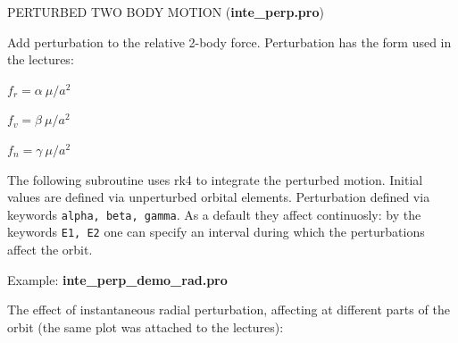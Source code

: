 \documentclass[a4paper,12pt]{article}
\def\red{\color{red}}
\def\black{\color{RGBblack}}
\begin{document}
{{\newpage

\black
{ PERTURBED TWO BODY MOTION} ({\bf inte\_perp.pro})


\hlin
\bul Add perturbation to the relative 2-body force. Perturbation has
the form used in the lectures:


\buu \buu {}

\buu \buu \buu $f_r = \alpha ~ \mu/a^2$   

\buu \buu \buu $f_v = \beta ~ \mu/a^2$

\buu \buu \buu $f_n = \gamma ~ \mu/a^2$

\bul The following subroutine uses rk4 to integrate the perturbed motion.
Initial values are defined via unperturbed orbital
elements. Perturbation defined via keywords {\tt alpha, beta,
gamma}. As a default they affect continuosly: by the keywords {\tt E1,
E2} one can specify an interval during which the perturbations affect
the orbit.





{\scriptsize \red

}\black

{\scriptsize \red

}\black

\newpage

\black

Example: {\bf inte\_perp\_demo\_rad.pro}

\bul The effect of instantaneous radial perturbation, affecting
 at different parts of the orbit (the same plot was attached to
the lectures):

{\scriptsize \red

}\black

}}
\end{document}
